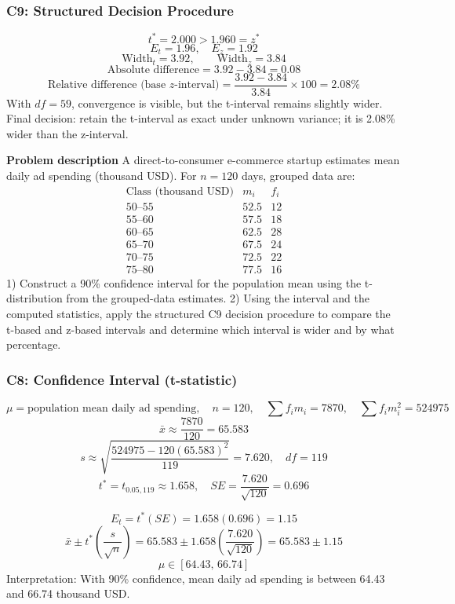 \begin{ExamProblems}
		\subsubsection*{C9: Structured Decision Procedure}
		\[
		t^*=2.000>1.960=z^*
		\]
		\[
		E_t=1.96,\quad E_z=1.92
		\]
		\[
		\text{Width}_t=3.92,\qquad \text{Width}_z=3.84
		\]
		\[
		\text{Absolute difference}=3.92-3.84=0.08
		\]
		\[
		\text{Relative difference (base }z\text{-interval)}=\frac{3.92-3.84}{3.84}\times 100=2.08\%
		\]
		With $df=59$, convergence is visible, but the t-interval remains slightly wider.
		Final decision: retain the t-interval as exact under unknown variance; it is 2.08\% wider than the z-interval.

		\newpage
		\item
		\textbf{Problem description}
		A direct-to-consumer e-commerce startup estimates mean daily ad spending (thousand USD).
		For $n=120$ days, grouped data are:
		\[
		\begin{array}{c|c|c}
		\text{Class (thousand USD)} & m_i & f_i\\\hline
		50\text{--}55 & 52.5 & 12\\
		55\text{--}60 & 57.5 & 18\\
		60\text{--}65 & 62.5 & 28\\
		65\text{--}70 & 67.5 & 24\\
		70\text{--}75 & 72.5 & 22\\
		75\text{--}80 & 77.5 & 16
		\end{array}
		\]
		1) Construct a 90\% confidence interval for the population mean using the t-distribution from the grouped-data estimates.
		2) Using the interval and the computed statistics, apply the structured C9 decision procedure to compare the t-based and z-based intervals and determine which interval is wider and by what percentage.

		\subsubsection*{C8: Confidence Interval (t-statistic)}
		\[
		\mu=\text{population mean daily ad spending},\quad n=120,\quad \sum f_im_i=7870,\quad \sum f_im_i^2=524975
		\]
		\[
		\bar{x}\approx\frac{7870}{120}=65.583
		\]
		\[
		s\approx\sqrt{\frac{524975-120(65.583)^2}{119}}=7.620,\quad df=119
		\]
		\[
		t^*=t_{0.05,119}\approx 1.658,\quad SE=\frac{7.620}{\sqrt{120}}=0.696
		\]

		\[
		E_t=t^*(SE)=1.658(0.696)=1.15
		\]
		\[
		\bar{x}\pm t^*\left(\frac{s}{\sqrt{n}}\right)=65.583\pm 1.658\left(\frac{7.620}{\sqrt{120}}\right)=65.583\pm 1.15
		\]
		\[
		\mu\in[64.43,\,66.74]
		\]
		Interpretation: With 90\% confidence, mean daily ad spending is between 64.43 and 66.74 thousand USD.


\end{ExamProblems}
